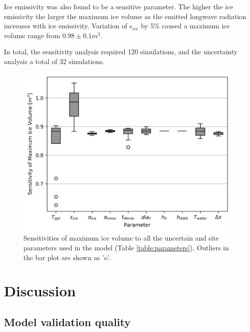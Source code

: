 \documentclass[utf8]{frontiersSCNS} %
\begin{document}
Ice emissivity was also found to be a sensitive parameter. The higher the ice emissivity the larger the maximum ice
volume as the emitted longwave radiation increases with ice emissivity. Variation of $\epsilon_{ice}$ by 5\% caused a
maximum ice volume range from $0.98 \pm 0.1 m^3$. 

In total, the sensitivity analysis required 120 simulations, and the uncertainty analysis a total of 32 simulations.

\begin{figure} \begin{center} \includegraphics[width=10 cm]{Figures/Figure_9.jpg} \end{center}
\caption{Sensitivities of maximum ice volume to all the uncertain and site parameters used in the model (Table
\ref{table:parameters}).  Outliers in the bar plot are shown as 'o'.} \label{fig:sensitivity} \end{figure}
\section{Discussion}

\subsection{Model validation quality}
\end{document}
